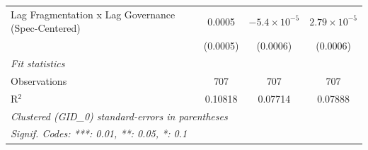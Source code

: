\begin{table}[H]
\begin{tabular}{lccc}
      Lag Fragmentation x Lag Governance (Spec-Centered) & 0.0005                      & $-5.4\times 10^{-5}$             & $2.79\times 10^{-5}$\\    
                                                         & (0.0005)                    & (0.0006)                         & (0.0006)\\   
      \midrule
      \emph{Fit statistics}\\
      Observations                                       & 707                         & 707                              & 707\\  
      R$^2$                                              & 0.10818                     & 0.07714                          & 0.07888\\  
      \midrule \midrule
      \multicolumn{4}{l}{\emph{Clustered (GID\_0) standard-errors in parentheses}}\\
      \multicolumn{4}{l}{\emph{Signif. Codes: ***: 0.01, **: 0.05, *: 0.1}}\\
   \end{tabular}
\end{table}


